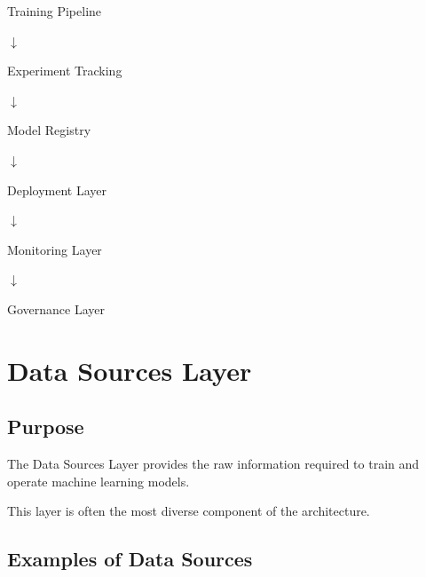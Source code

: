\begin{center}
Training Pipeline
\end{center}

\begin{center}
$\downarrow$
\end{center}

\begin{center}
Experiment Tracking
\end{center}

\begin{center}
$\downarrow$
\end{center}

\begin{center}
Model Registry
\end{center}

\begin{center}
$\downarrow$
\end{center}

\begin{center}
Deployment Layer
\end{center}

\begin{center}
$\downarrow$
\end{center}

\begin{center}
Monitoring Layer
\end{center}

\begin{center}
$\downarrow$
\end{center}

\begin{center}
Governance Layer
\end{center}

\section{Data Sources Layer}

\subsection{Purpose}

The Data Sources Layer provides the raw information required to train and operate machine learning models.

This layer is often the most diverse component of the architecture.

\subsection{Examples of Data Sources}

